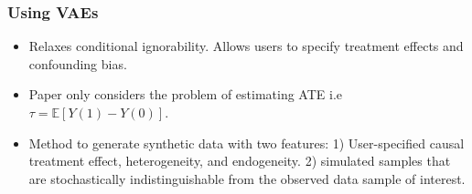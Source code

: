 \documentclass{beamer}
\begin{document}
\begin{frame}
	\frametitle{Using VAEs}
	\begin{itemize}
		\item Relaxes conditional ignorability. Allows users to specify treatment effects and confounding bias.
		\item Paper only considers the problem of estimating ATE i.e $ \tau = \mathbb{E}[Y(1) - Y(0)] $.
		\item Method to generate synthetic data with two features: 1) User-specified causal treatment effect, heterogeneity, and endogeneity. 2) simulated samples that are stochastically indistinguishable from the observed data sample of interest.
	\end{itemize}
\end{frame}
\end{document}
